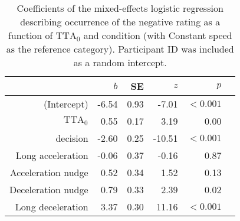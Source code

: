 \begin{table}[h]
\centering
\caption{Coefficients of the mixed-effects logistic regression describing occurrence of the negative rating as a function of $\textrm{TTA}_0$ and condition (with Constant speed as the reference category). Participant ID was included as a random intercept.}
\label{tab:rating}
\begin{tabular}{rrrrrr}
\toprule
 & $b$ & SE & $z$ & $p$ \\
\midrule
(Intercept) & -6.54 & 0.93 & -7.01 & $<0.001$ \\
$\textrm{TTA}_0$ & 0.55 & 0.17 & 3.19 & 0.00 \\
decision & -2.60 & 0.25 & -10.51 & $<0.001$ \\
Long acceleration & -0.06 & 0.37 & -0.16 & 0.87 \\
Acceleration nudge & 0.52 & 0.34 & 1.52 & 0.13 \\
Deceleration nudge & 0.79 & 0.33 & 2.39 & 0.02 \\
Long deceleration & 3.37 & 0.30 & 11.16 & $<0.001$ \\
\bottomrule
\end{tabular}
\end{table}
